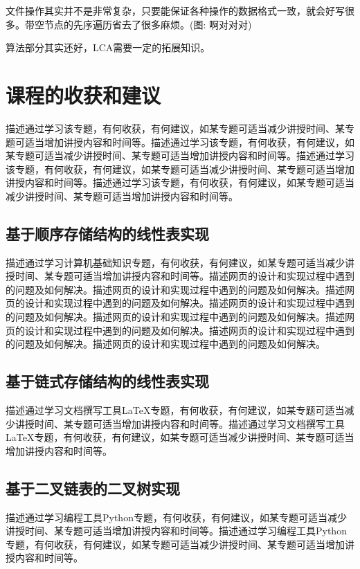\documentclass[supercite]{Experimental_Report}
\theoremstyle{definition}
\begin{document}
文件操作其实并不是非常复杂，只要能保证各种操作的数据格式一致，就会好写很多。带空节点的先序遍历省去了很多麻烦。(图: 啊对对对)

算法部分其实还好，LCA需要一定的拓展知识。

\newpage

\section{课程的收获和建议}

描述通过学习该专题，有何收获，有何建议，如某专题可适当减少讲授时间、某专题可适当增加讲授内容和时间等。描述通过学习该专题，有何收获，有何建议，如某专题可适当减少讲授时间、某专题可适当增加讲授内容和时间等。描述通过学习该专题，有何收获，有何建议，如某专题可适当减少讲授时间、某专题可适当增加讲授内容和时间等。描述通过学习该专题，有何收获，有何建议，如某专题可适当减少讲授时间、某专题可适当增加讲授内容和时间等。

\subsection{基于顺序存储结构的线性表实现}

描述通过学习计算机基础知识专题，有何收获，有何建议，如某专题可适当减少讲授时间、某专题可适当增加讲授内容和时间等。描述网页的设计和实现过程中遇到的问题及如何解决。描述网页的设计和实现过程中遇到的问题及如何解决。描述网页的设计和实现过程中遇到的问题及如何解决。描述网页的设计和实现过程中遇到的问题及如何解决。描述网页的设计和实现过程中遇到的问题及如何解决。描述网页的设计和实现过程中遇到的问题及如何解决。描述网页的设计和实现过程中遇到的问题及如何解决。描述网页的设计和实现过程中遇到的问题及如何解决。

\subsection{基于链式存储结构的线性表实现}

描述通过学习文档撰写工具LaTeX专题，有何收获，有何建议，如某专题可适当减少讲授时间、某专题可适当增加讲授内容和时间等。描述通过学习文档撰写工具LaTeX专题，有何收获，有何建议，如某专题可适当减少讲授时间、某专题可适当增加讲授内容和时间等。

\subsection{基于二叉链表的二叉树实现}

描述通过学习编程工具Python专题，有何收获，有何建议，如某专题可适当减少讲授时间、某专题可适当增加讲授内容和时间等。描述通过学习编程工具Python专题，有何收获，有何建议，如某专题可适当减少讲授时间、某专题可适当增加讲授内容和时间等。
\end{document}
